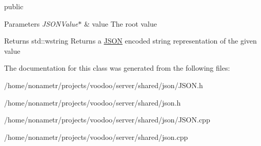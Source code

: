 public


\begin{DoxyParams}{\-Parameters}
{\em \-J\-S\-O\-N\-Value$\ast$} & value \-The root value\\
\hline
\end{DoxyParams}
\begin{DoxyReturn}{\-Returns}
std\-::wstring \-Returns a \hyperlink{classJSON}{\-J\-S\-O\-N} encoded string representation of the given value 
\end{DoxyReturn}


\-The documentation for this class was generated from the following files\-:\begin{DoxyCompactItemize}
\item 
/home/nonametr/projects/voodoo/server/shared/json/\-J\-S\-O\-N.\-h\item 
/home/nonametr/projects/voodoo/server/shared/json.\-h\item 
/home/nonametr/projects/voodoo/server/shared/json/\-J\-S\-O\-N.\-cpp\item 
/home/nonametr/projects/voodoo/server/shared/json.\-cpp\end{DoxyCompactItemize}
